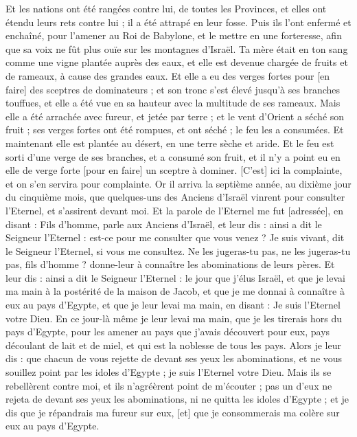 \begin{multicols}{2}
Et les nations ont été rangées contre lui, de toutes les Provinces, et elles ont étendu leurs rets contre lui ; il a été attrapé en leur fosse.
Puis ils l'ont enfermé et enchaîné, pour l'amener au Roi de Babylone, et le mettre en une forteresse, afin que sa voix ne fût plus ouïe sur les montagnes d'Israël.
Ta mère était en ton sang comme une vigne plantée auprès des eaux, et elle est devenue chargée de fruits et de rameaux, à cause des grandes eaux.
Et elle a eu des verges fortes pour [en faire] des sceptres de dominateurs ; et son tronc s'est élevé jusqu'à ses branches touffues, et elle a été vue en sa hauteur avec la multitude de ses rameaux.
Mais elle a été arrachée avec fureur, et jetée par terre ; et le vent d'Orient a séché son fruit ; ses verges fortes ont été rompues, et ont séché ; le feu les a consumées.
Et maintenant elle est plantée au désert, en une terre sèche et aride.
Et le feu est sorti d'une verge de ses branches, et a consumé son fruit, et il n'y a point eu en elle de verge forte [pour en faire] un sceptre à dominer. [C'est] ici la complainte, et on s'en servira pour complainte.
\VerseOne{}Or il arriva la septième année, au dixième jour du cinquième mois, que quelques-uns des Anciens d'Israël vinrent pour consulter l'Eternel, et s'assirent devant moi.
Et la parole de l'Eternel me fut [adressée], en disant :
Fils d'homme, parle aux Anciens d'Israël, et leur dis : ainsi a dit le Seigneur l'Eternel : est-ce pour me consulter que vous venez ? Je suis vivant, dit le Seigneur l'Eternel, si vous me consultez.
Ne les jugeras-tu pas, ne les jugeras-tu pas, fils d'homme ? donne-leur à connaître les abominations de leurs pères.
Et leur dis : ainsi a dit le Seigneur l'Eternel : le jour que j'élus Israël, et que je levai ma main à la postérité de la maison de Jacob, et que je me donnai à connaître à eux au pays d'Egypte, et que je leur levai ma main, en disant : Je suis l'Eternel votre Dieu.
En ce jour-là même je leur levai ma main, que je les tirerais hors du pays d'Egypte, pour les amener au pays que j'avais découvert pour eux, pays découlant de lait et de miel, et qui est la noblesse de tous les pays.
Alors je leur dis : que chacun de vous rejette de devant ses yeux les abominations, et ne vous souillez point par les idoles d'Egypte ; je suis l'Eternel votre Dieu.
Mais ils se rebellèrent contre moi, et ils n'agréèrent point de m'écouter ; pas un d'eux ne rejeta de devant ses yeux les abominations, ni ne quitta les idoles d'Egypte ; et je dis que je répandrais ma fureur sur eux, [et] que je consommerais ma colère sur eux au pays d'Egypte.

\end{multicols}
